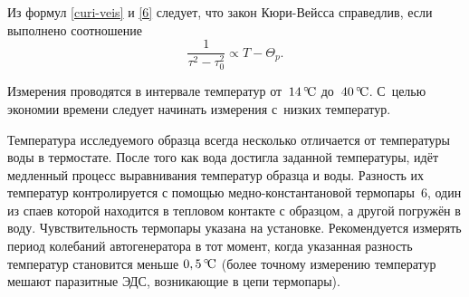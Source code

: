 Из формул \eqref{curi-veis} и \eqref{6} следует, что закон Кюри-Вейсса
справедлив, если выполнено соотношение
\begin{equation}
\frac{1}{\tau^2-\tau_0^2} \propto T-\Theta_p.
\end{equation}

Измерения проводятся в интервале температур от~$14\,^\circ\!\mathrm{C}$ до~$40\,^\circ\!\mathrm{C}$.
С~целью экономии времени следует начинать измерения с~низких температур.



Температура исследуемого образца всегда несколько отличается от температуры
воды в термостате. После того как вода достигла заданной
температуры, идёт медленный процесс выравнивания температур образца и воды.
Разность их температур контролируется с помощью медно-константановой
термопары~6, один из спаев которой находится в тепловом
контакте с образцом, а другой погружён в воду. Чувствительность термопары
указана на установке. Рекомендуется измерять период колебаний автогенератора в
тот момент, когда указанная разность температур становится меньше $0,5\,^\circ\!\mathrm{C}$
(более точному измерению температур мешают паразитные ЭДС, возникающие в цепи
термопары).

